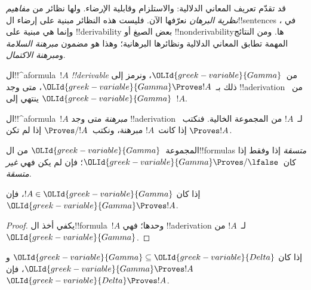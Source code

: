 \documentclass[../../../include/open-logic-section]{subfiles}
\begin{document}
      {}
      {}


\begin{explain}
قد تقدّم تعريف المعاني الدلالية:
 والاستلزام وقابلية الإرضاء.
ولها نظائر من \emph{مفاهيم نظرية البرهان} نعرّفها الآن.
فليست هذه النظائر مبنية على إرضاء ال!!{sentence}s في
، وإنما هي مبنية على
!!{derivability} بعض الصيغ أو !!{nonderivability}ها.
ومن النتائج المهمة تطابق المعاني الدلالية ونظائرها البرهانية؛
وهذا هو مضمون \emph{مبرهنة السلامة} و\emph{مبرهنة الاكتمال}.
\end{explain}

\begin{defn}[!!^{derivability}]
ال!!^a{formula}~$!A$ \emph{!!{derivable}} من~$\OLId{greek-variable}{Gamma}$،
ونرمز إلى ذلك بـ~$\OLId{greek-variable}{Gamma} \Proves !A$، متى وجد !!a{derivation}
من~$\OLId{greek-variable}{Gamma}$ ينتهي إلى~$!A$.
\end{defn}

\begin{defn}[المبرهنات]
ال!!^a{formula}~$!A$ \emph{مبرهنة} متى وجد !!a{derivation}
لـ~$!A$ من المجموعة الخالية. فنكتب~$\Proves !A$ إذا كانت~$!A$
مبرهنة، ونكتب~$\Proves/ !A$ إذا لم تكن.
\end{defn}

\begin{defn}[الاتساق]
المجموعة~$\OLId{greek-variable}{Gamma}$ من ال!!{formula}s \emph{متسقة} إذا وفقط إذا
كان~$\OLId{greek-variable}{Gamma}\Proves/ \lfalse$؛ فإن لم يكن فهي \emph{غير متسقة}.
\end{defn}

\begin{prop}[الانعكاسية]
إذا كان $!A \in \OLId{greek-variable}{Gamma}$، فإن $\OLId{greek-variable}{Gamma} \Proves !A$.
\end{prop}

\begin{proof}
  يكفي أخذ ال!!{formula}~$!A$ وحدها؛ فهي !!a{derivation}
  لـ~$!A$ من~$\OLId{greek-variable}{Gamma}$.
\end{proof}

\begin{prop}[الرتابة]
إذا كان $\OLId{greek-variable}{Gamma} \subseteq \OLId{greek-variable}{Delta}$ و$\OLId{greek-variable}{Gamma} \Proves !A$، فإن $\OLId{greek-variable}{Delta}
\Proves !A$.
\end{prop}
\end{document}
